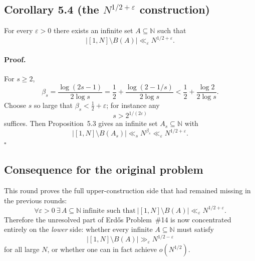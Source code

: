 \subsection*{Corollary 5.4 (the $N^{1/2+\varepsilon}$ construction)}
For every $\varepsilon>0$ there exists an infinite set $A\subseteq\mathbb N$ such that
\[
|[1,N]\setminus B(A)|\ll_{\varepsilon} N^{1/2+\varepsilon}.
\]

\paragraph{Proof.}
For $s\ge 2$,
\[
\beta_s
=\frac{\log(2s-1)}{2\log s}
=\frac12+\frac{\log(2-1/s)}{2\log s}
<\frac12+\frac{\log 2}{2\log s}.
\]
Choose $s$ so large that $\beta_s<\tfrac12+\varepsilon$; for instance any
\[
s>2^{1/(2\varepsilon)}
\]
suffices. Then Proposition~5.3 gives an infinite set $A_s\subseteq\mathbb N$ with
\[
|[1,N]\setminus B(A_s)|\ll_s N^{\beta_s}\ll_{\varepsilon} N^{1/2+\varepsilon}.
\]
\hfill$\square$

\subsection*{Consequence for the original problem}
This round proves the full upper-construction side that had remained missing in the previous rounds:
\[
\forall\varepsilon>0\ \exists\, A\subseteq\mathbb N\ \text{infinite such that}\ |[1,N]\setminus B(A)|\ll_{\varepsilon}N^{1/2+\varepsilon}.
\]
Therefore the unresolved part of Erd\H{o}s Problem~\#14 is now concentrated entirely on the \emph{lower} side: whether every infinite $A\subseteq\mathbb N$ must satisfy
\[
|[1,N]\setminus B(A)|\gg_{\varepsilon}N^{1/2-\varepsilon}
\]
for all large $N$, or whether one can in fact achieve $o(N^{1/2})$.

